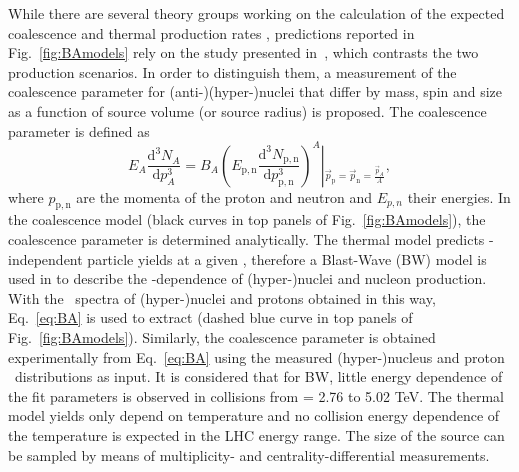 While there are several theory groups working on the calculation of the expected coalescence \cite{Scheibl:1998tk, Cho:2017dcy, Zhang:2018euf, Bazak:2018hgl, Zhao:2018lyf} and thermal production rates \cite{Andronic:2010qu, Wheaton:2004qb, Petran:2013dva}, predictions reported in Fig.~\ref{fig:BAmodels} rely on the study presented in~\cite{Bellini:2018epz}, which contrasts the two production scenarios. 
In order to distinguish them, a measurement of the coalescence parameter for (anti-)(hyper-)nuclei that differ by mass, spin and size 
as a function of source volume (or source radius) is proposed. 
%
The coalescence parameter \BA is defined as 
%
\begin{equation}
E_{A}\frac{\mathrm{d}^{3}N_{A}}{\mathrm{d}p_{A}^{3}}=B_{A}{\left(E_{\mathrm{p,n}}\frac{\mathrm{d}^{3}N_{\mathrm{p,n}}}{\mathrm{d}p_{\mathrm{p,n}}^{3}}\right)^{A}}\left\vert_{\vec{p}_{\mathrm{p}}=\vec{p}_{\mathrm{n}}=\frac{\vec{p}_{A}}{A}} \right.,
\label{eq:BA}
\end{equation}
%
\noindent where $p_{\mathrm{p,n}}$ are the momenta of the proton and neutron and $E_{p,n}$ their energies. In the coalescence model (black curves in top panels of Fig.~\ref{fig:BAmodels}), the coalescence parameter is determined analytically. The thermal model predicts \pT-independent particle yields at a given \Tchem, therefore a Blast-Wave (BW) model is used in \cite{Bellini:2018epz} to describe the \pT-dependence of (hyper-)nuclei and nucleon production. With the \pT~spectra of (hyper-)nuclei and protons obtained in this way, Eq.~\ref{eq:BA} is used to extract \BA (dashed blue curve in top panels of Fig.~\ref{fig:BAmodels}). 
Similarly, the coalescence parameter is obtained experimentally from Eq.~\ref{eq:BA} using the measured (hyper-)nucleus and proton \pT~distributions as input.
It is considered that for BW, little energy dependence of the fit parameters is observed in \PbPb collisions from \sqrtsNN = 2.76 to 5.02 TeV.
The thermal model yields only depend on temperature and no collision energy dependence of the temperature is expected in the LHC energy range.
%
The size of the source can be sampled by means of multiplicity- and centrality-differential measurements.
%

